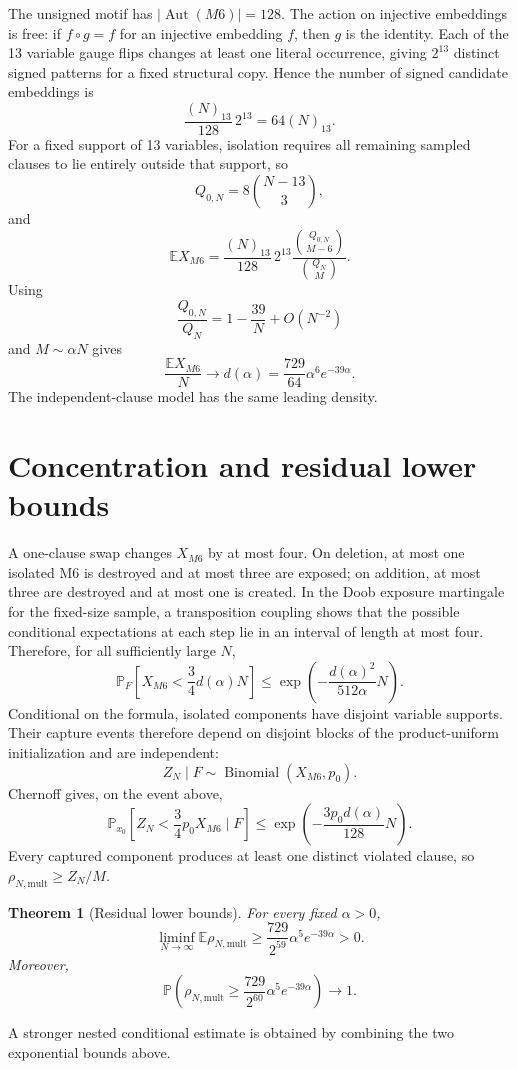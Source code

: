 \documentclass[11pt,a4paper]{article}
\newtheorem{theorem}{Theorem}[section]
\begin{document}
The unsigned motif has $|\operatorname{Aut}(M6)|=128$. The action on injective embeddings is free: if $f\circ g=f$ for an injective embedding $f$, then $g$ is the identity. Each of the 13 variable gauge flips changes at least one literal occurrence, giving $2^{13}$ distinct signed patterns for a fixed structural copy. Hence the number of signed candidate embeddings is
\[
\frac{(N)_{13}}{128}\,2^{13}=64(N)_{13}.
\]
For a fixed support of 13 variables, isolation requires all remaining sampled clauses to lie entirely outside that support, so
\[
Q_{0,N}=8\binom{N-13}{3},
\]
and
\begin{equation}
\mathbb E X_{M6}=\frac{(N)_{13}}{128}\,2^{13}\frac{\binom{Q_{0,N}}{M-6}}{\binom{Q_N}{M}}.
\end{equation}
Using
\[
\frac{Q_{0,N}}{Q_N}=1-\frac{39}{N}+O(N^{-2})
\]
and $M\sim\alpha N$ gives
\begin{equation}
\frac{\mathbb E X_{M6}}N\longrightarrow d(\alpha)=\frac{729}{64}\alpha^6e^{-39\alpha}.
\end{equation}
The independent-clause model has the same leading density.
\section{Concentration and residual lower bounds}
A one-clause swap changes $X_{M6}$ by at most four. On deletion, at most one isolated M6 is destroyed and at most three are exposed; on addition, at most three are destroyed and at most one is created. In the Doob exposure martingale for the fixed-size sample, a transposition coupling shows that the possible conditional expectations at each step lie in an interval of length at most four. Therefore, for all sufficiently large $N$,
\begin{equation}
\mathbb P_F\!\left[X_{M6}<\frac34d(\alpha)N\right]\le\exp\!\left(-\frac{d(\alpha)^2}{512\alpha}N\right).
\end{equation}
Conditional on the formula, isolated components have disjoint variable supports. Their capture events therefore depend on disjoint blocks of the product-uniform initialization and are independent:
\[
Z_N\mid F\sim\operatorname{Binomial}(X_{M6},p_0).
\]
Chernoff gives, on the event above,
\[
\mathbb P_{x_0}\!\left[Z_N<\frac34p_0X_{M6}\mid F\right]\le\exp\!\left(-\frac{3p_0d(\alpha)}{128}N\right).
\]
Every captured component produces at least one distinct violated clause, so $\rho_{N,\mathrm{mult}}\ge Z_N/M$.
\begin{theorem}[Residual lower bounds]
For every fixed $\alpha>0$,
\[
\liminf_{N\to\infty}\mathbb E\rho_{N,\mathrm{mult}}\ge\frac{729}{2^{59}}\alpha^5e^{-39\alpha}>0.
\]
Moreover,
\[
\mathbb P\!\left(\rho_{N,\mathrm{mult}}\ge\frac{729}{2^{60}}\alpha^5e^{-39\alpha}\right)\to1.
\]
\end{theorem}
A stronger nested conditional estimate is obtained by combining the two exponential bounds above.
\end{document}
